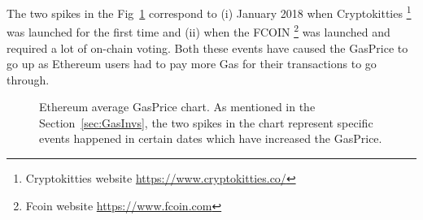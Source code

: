 


The two spikes in the Fig~\ref{fig:Gas} correspond to (i) January 2018 when Cryptokitties \footnote{Cryptokitties website \url{https://www.cryptokitties.co/}} was launched for the first time and (ii) when the FCOIN \footnote{Fcoin website \url{https://www.fcoin.com}} was launched and required a lot of on-chain voting. Both these events have caused the GasPrice to go up as Ethereum users had to pay more Gas for their transactions to go through.



\begin{figure}[!htb]
	
	\centering
	\hfill
	\caption {Ethereum average GasPrice chart. As mentioned in the Section~\ref{sec:GasInvs}, the two spikes in the chart represent specific events happened in certain dates which have increased the GasPrice.}
	\label{fig:Gas}
	
\end{figure}

